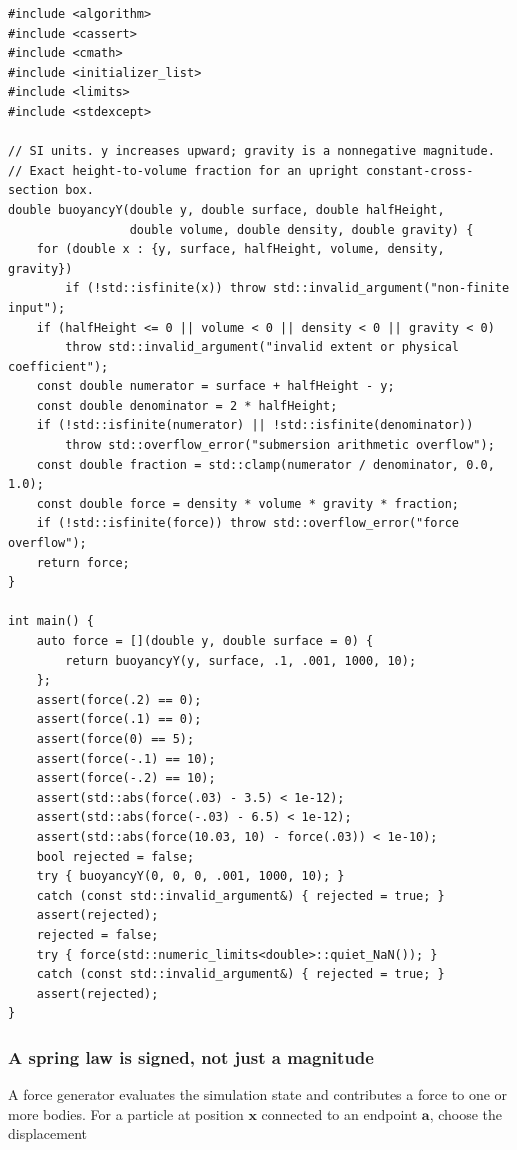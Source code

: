 \begin{verbatim}
#include <algorithm>
#include <cassert>
#include <cmath>
#include <initializer_list>
#include <limits>
#include <stdexcept>

// SI units. y increases upward; gravity is a nonnegative magnitude.
// Exact height-to-volume fraction for an upright constant-cross-section box.
double buoyancyY(double y, double surface, double halfHeight,
                 double volume, double density, double gravity) {
    for (double x : {y, surface, halfHeight, volume, density, gravity})
        if (!std::isfinite(x)) throw std::invalid_argument("non-finite input");
    if (halfHeight <= 0 || volume < 0 || density < 0 || gravity < 0)
        throw std::invalid_argument("invalid extent or physical coefficient");
    const double numerator = surface + halfHeight - y;
    const double denominator = 2 * halfHeight;
    if (!std::isfinite(numerator) || !std::isfinite(denominator))
        throw std::overflow_error("submersion arithmetic overflow");
    const double fraction = std::clamp(numerator / denominator, 0.0, 1.0);
    const double force = density * volume * gravity * fraction;
    if (!std::isfinite(force)) throw std::overflow_error("force overflow");
    return force;
}

int main() {
    auto force = [](double y, double surface = 0) {
        return buoyancyY(y, surface, .1, .001, 1000, 10);
    };
    assert(force(.2) == 0);
    assert(force(.1) == 0);
    assert(force(0) == 5);
    assert(force(-.1) == 10);
    assert(force(-.2) == 10);
    assert(std::abs(force(.03) - 3.5) < 1e-12);
    assert(std::abs(force(-.03) - 6.5) < 1e-12);
    assert(std::abs(force(10.03, 10) - force(.03)) < 1e-10);
    bool rejected = false;
    try { buoyancyY(0, 0, 0, .001, 1000, 10); }
    catch (const std::invalid_argument&) { rejected = true; }
    assert(rejected);
    rejected = false;
    try { force(std::numeric_limits<double>::quiet_NaN()); }
    catch (const std::invalid_argument&) { rejected = true; }
    assert(rejected);
}
\end{verbatim}

\subsubsection{A spring law is signed, not just a magnitude}\label{a-spring-law-is-signed-not-just-a-magnitude}

A force generator evaluates the simulation state and contributes a force to one or more bodies. For a particle at position \(\mathbf{x}\) connected to an endpoint \(\mathbf{a}\), choose the displacement

